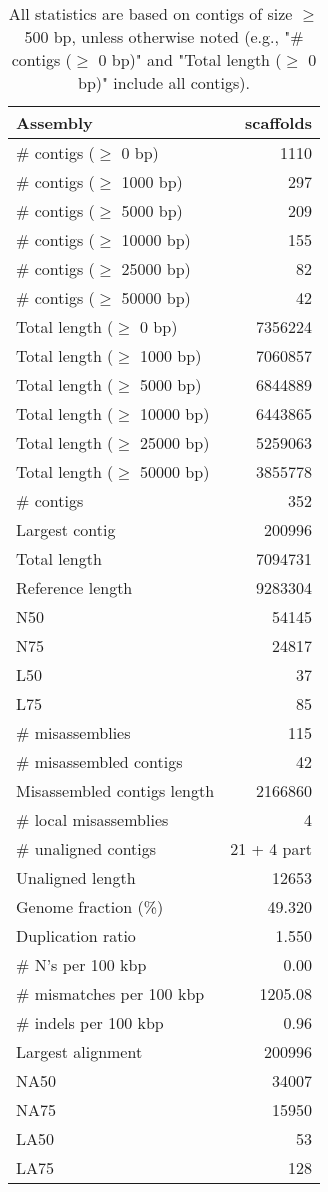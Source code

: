 \documentclass[12pt,a4paper]{article}
\begin{document}
\begin{table}[ht]
\begin{center}
\caption{All statistics are based on contigs of size $\geq$ 500 bp, unless otherwise noted (e.g., "\# contigs ($\geq$ 0 bp)" and "Total length ($\geq$ 0 bp)" include all contigs).}
\begin{tabular}{|l*{1}{|r}|}
\hline
Assembly & scaffolds \\ \hline
\# contigs ($\geq$ 0 bp) & 1110 \\ \hline
\# contigs ($\geq$ 1000 bp) & 297 \\ \hline
\# contigs ($\geq$ 5000 bp) & 209 \\ \hline
\# contigs ($\geq$ 10000 bp) & 155 \\ \hline
\# contigs ($\geq$ 25000 bp) & 82 \\ \hline
\# contigs ($\geq$ 50000 bp) & 42 \\ \hline
Total length ($\geq$ 0 bp) & 7356224 \\ \hline
Total length ($\geq$ 1000 bp) & 7060857 \\ \hline
Total length ($\geq$ 5000 bp) & 6844889 \\ \hline
Total length ($\geq$ 10000 bp) & 6443865 \\ \hline
Total length ($\geq$ 25000 bp) & 5259063 \\ \hline
Total length ($\geq$ 50000 bp) & 3855778 \\ \hline
\# contigs & 352 \\ \hline
Largest contig & 200996 \\ \hline
Total length & 7094731 \\ \hline
Reference length & 9283304 \\ \hline
N50 & 54145 \\ \hline
N75 & 24817 \\ \hline
L50 & 37 \\ \hline
L75 & 85 \\ \hline
\# misassemblies & 115 \\ \hline
\# misassembled contigs & 42 \\ \hline
Misassembled contigs length & 2166860 \\ \hline
\# local misassemblies & 4 \\ \hline
\# unaligned contigs & 21 + 4 part \\ \hline
Unaligned length & 12653 \\ \hline
Genome fraction (\%) & 49.320 \\ \hline
Duplication ratio & 1.550 \\ \hline
\# N's per 100 kbp & 0.00 \\ \hline
\# mismatches per 100 kbp & 1205.08 \\ \hline
\# indels per 100 kbp & 0.96 \\ \hline
Largest alignment & 200996 \\ \hline
NA50 & 34007 \\ \hline
NA75 & 15950 \\ \hline
LA50 & 53 \\ \hline
LA75 & 128 \\ \hline
\end{tabular}
\end{center}
\end{table}
\end{document}
